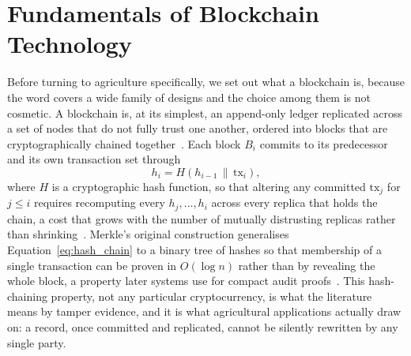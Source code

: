 \documentclass[12pt,a4paper,oneside]{book}
\begin{document}
\section{Fundamentals of Blockchain Technology}
\label{subsec:lit_fundamentals}

Before turning to agriculture specifically, we set out what a blockchain
is, because the word covers a wide family of designs and the choice among
them is not cosmetic. A blockchain is, at its simplest, an
append-only ledger replicated across a set of nodes that do not
fully trust one another, ordered into blocks that are cryptographically
chained together~\cite{christidis2016blockchain, debruyne2022trust}. Each
block $B_i$ commits to its predecessor and its own transaction set through
\begin{equation}
h_i = H\!\left( h_{i-1} \,\|\, \mathrm{tx}_i \right),
\label{eq:hash_chain}
\end{equation}
where $H$ is a cryptographic hash function, so that altering any committed
$\mathrm{tx}_j$ for $j \le i$ requires recomputing every $h_j,\ldots,h_i$
across every replica that holds the chain, a cost that grows with the
number of mutually distrusting replicas rather than
shrinking~\cite{fernandez2024iotTamper}. Merkle's original construction
generalises Equation~\ref{eq:hash_chain} to a binary tree of hashes so that
membership of a single transaction can be proven in $O(\log n)$ rather than
by revealing the whole block, a property later systems use for compact
audit proofs~\cite{sharma2018merkle}. This hash-chaining property, not any
particular cryptocurrency, is what the literature means by tamper evidence,
and it is what agricultural applications actually draw on: a record, once
committed and replicated, cannot be silently rewritten by any single party.
\end{document}
